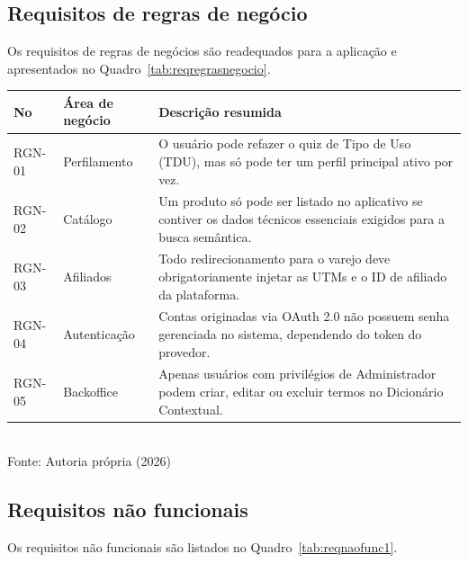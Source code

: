 \subsection {Requisitos de regras de negócio}
Os requisitos de regras de negócios são readequados para a aplicação e apresentados no Quadro~\ref{tab:reqregrasnegocio}.

\begin{quadro}[!htbp]
\centering
\caption{Requisitos de regras de negócio}
	\begin{tabular}{ | m{1.7cm} | m{3cm}| m{10cm} | }
		\hline
		\cellcolor{gray!20}\textbf{No} & \cellcolor{gray!20}\textbf{Área de negócio} & \cellcolor{gray!20}\textbf{Descrição resumida} \\ \hline
        RGN-01 & Perfilamento & O usuário pode refazer o quiz de Tipo de Uso (TDU), mas só pode ter um perfil principal ativo por vez.\\ \hline
        RGN-02 & Catálogo & Um produto só pode ser listado no aplicativo se contiver os dados técnicos essenciais exigidos para a busca semântica.\\ \hline
        RGN-03 & Afiliados & Todo redirecionamento para o varejo deve obrigatoriamente injetar as UTMs e o ID de afiliado da plataforma.\\ \hline
        RGN-04 & Autenticação & Contas originadas via OAuth 2.0 não possuem senha gerenciada no sistema, dependendo do token do provedor.\\ \hline
        RGN-05 & Backoffice & Apenas usuários com privilégios de Administrador podem criar, editar ou excluir termos no Dicionário Contextual.\\ \hline       
	\end{tabular}
	\\ \vspace{0.2cm}
	Fonte: Autoria própria (2026)
	\label{tab:reqregrasnegocio}
\end{quadro}


\subsection {Requisitos não funcionais}
Os requisitos não funcionais são listados no Quadro~\ref{tab:reqnaofunc1}.

